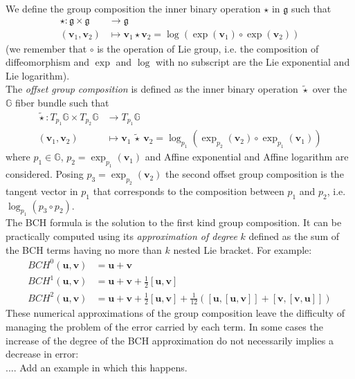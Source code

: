 We define the group composition the inner binary operation $\star$ in $\mathfrak{g}$ such that 
\begin{align*}
\star : \mathfrak{g} \times \mathfrak{g} & \longrightarrow \mathfrak{g}    \\
(\mathbf{v}_{1}, \mathbf{v}_{2}) &\longmapsto \mathbf{v}_{1}\star \mathbf{v}_{2} =  \log(\exp(\mathbf{v}_1)\circ \exp(\mathbf{v}_2))
\end{align*}
(we remember that $\circ$ is the operation of Lie group, i.e. the composition of diffeomorphism and $\exp$ and $\log$ with no subscript are the Lie exponential and Lie logarithm).\\
The \emph{offset group composition} is defined as the inner binary operation $\tilde{\star} $ over the $\mathbb{G}$ fiber bundle such that 
\begin{align*}
\tilde{\star} : T_{p_1}\mathbb{G} \times T_{p_2}\mathbb{G} & \longrightarrow T_{p_1}\mathbb{G}   
\\
(\mathbf{v}_{1}, \mathbf{v}_{2}) &\longmapsto \mathbf{v}_{1}~\tilde{\star}~ \mathbf{v}_{2}
=
\log_{p_1}(\exp_{p_2}(\mathbf{v}_{2})\circ\exp_{p_1}(\mathbf{v}_{1}))
\end{align*}
where $p_1 \in \mathbb{G}$, $p_2 = \exp_{p_1}(\mathbf{v}_{1})$ and Affine exponential and Affine logarithm are considered. Posing $p_3 = \exp_{p_2}(\mathbf{v}_{2})$ the second offset group composition is the tangent vector in $p_1$ that corresponds to the composition between $p_1$ and $p_2$, i.e. $\log_{p_1}(p_3 \circ p_2)$. \\
The BCH formula is the solution to the first kind group composition. It can be practically computed using its \emph{approximation of degree} $k$ defined as the sum of the BCH terms having no more than $k$ nested Lie bracket. For example:
\begin{align*}
BCH^{0}(\mathbf{u},\mathbf{v}) &= \mathbf{u} + \mathbf{v} \\
BCH^{1}(\mathbf{u},\mathbf{v}) &=  \mathbf{u} + \mathbf{v} + \frac{1}{2}[\mathbf{u},\mathbf{v}] \\
BCH^{2}(\mathbf{u},\mathbf{v}) &=  \mathbf{u} + \mathbf{v} + \frac{1}{2}[\mathbf{u},\mathbf{v}] + \frac{1}{12}([\mathbf{u},[\mathbf{u},\mathbf{v}]] + [\mathbf{v},[\mathbf{v},\mathbf{u}]])
\end{align*}
These numerical approximations of the group composition leave the difficulty of managing the problem of the error carried by each term. In some cases the increase of the degree of the BCH approximation do not necessarily implies a decrease in error: \\
.... Add an example in which this happens.

